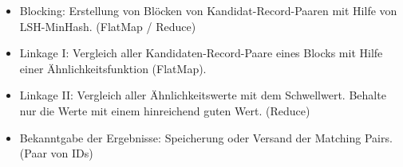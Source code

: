\documentclass[10pt]{article}
\begin{document}
 		\begin{itemize}
        		\item Blocking: Erstellung von Blöcken von Kandidat-Record-Paaren mit Hilfe von
        		 LSH-MinHash. (FlatMap / Reduce)
			\item Linkage I: Vergleich aller Kandidaten-Record-Paare eines Blocks mit Hilfe einer
			 Ähnlichkeitsfunktion (FlatMap).
			\item Linkage II: Vergleich aller Ähnlichkeitswerte mit dem Schwellwert. Behalte nur
			 die Werte mit einem hinreichend guten Wert. (Reduce)
			\item Bekanntgabe der Ergebnisse: Speicherung oder Versand der Matching Pairs.
			 (Paar von IDs)
		\end{itemize}



\end{document}
